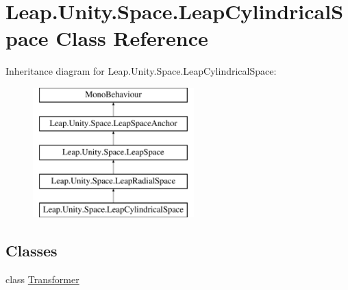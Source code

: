 \hypertarget{class_leap_1_1_unity_1_1_space_1_1_leap_cylindrical_space}{}\section{Leap.\+Unity.\+Space.\+Leap\+Cylindrical\+Space Class Reference}
\label{class_leap_1_1_unity_1_1_space_1_1_leap_cylindrical_space}
Inheritance diagram for Leap.\+Unity.\+Space.\+Leap\+Cylindrical\+Space\+:\begin{figure}[H]
\begin{center}
\leavevmode
\includegraphics[height=5.000000cm]{class_leap_1_1_unity_1_1_space_1_1_leap_cylindrical_space}
\end{center}
\end{figure}
\subsection*{Classes}
\begin{DoxyCompactItemize}
\item 
class \mbox{\hyperlink{class_leap_1_1_unity_1_1_space_1_1_leap_cylindrical_space_1_1_transformer}{Transformer}}
\end{DoxyCompactItemize}
